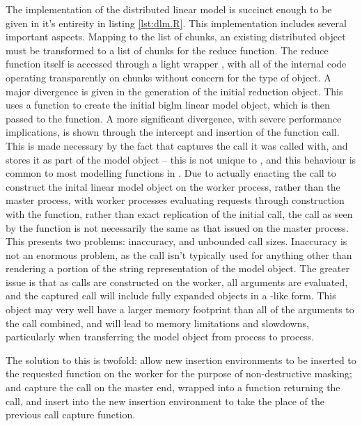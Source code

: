 \documentclass[a4paper, 10pt]{article}
\begin{document}
The implementation of the distributed linear model is succinct enough to be given in it's entireity in listing \ref{lst:dlm.R}.
This implementation includes several important aspects.
Mapping to the list of chunks, an existing distributed object must be transformed to a list of chunks for the reduce function.
The reduce function itself is accessed through a light wrapper , with all of the internal code operating transparently on chunks without concern for the type of object.
A major divergence is given in the generation of the initial reduction object.
This uses a  function to create the initial biglm linear model object, which is then passed to the  function.
A more significant divergence, with severe performance implications, is shown through the intercept and insertion of the function call.
This is made necessary by the fact that  captures the call it was called with, and stores it as part of the model object -- this is not unique to , and this behaviour is common to most modelling functions in \R{}.
Due to actually enacting the call to construct the inital  linear model object on the worker process, rather than the master process, with worker processes evaluating requests through construction with the  function, rather than exact replication of the initial call, the call as seen by the function is not necessarily the same as that issued on the master process.
This presents two problems: inaccuracy, and unbounded call sizes.
Inaccuracy is not an enormous problem, as the call isn't typically used for anything other than rendering a portion of the string representation of the model object.
The greater issue is that as calls are constructed on the worker, all arguments are evaluated, and the captured call will include fully expanded objects in a -like form.
This object may very well have a larger memory footprint than all of the arguments to the call combined, and will lead to memory limitations and slowdowns, particularly when transferring the model object from process to process.

The solution to this is twofold: allow new insertion environments to be inserted to the requested function on the worker for the purpose of non-destructive masking; and capture the call on the master end, wrapped into a function returning the call, and insert into the new insertion environment to take the place of the previous call capture function.
\end{document}
